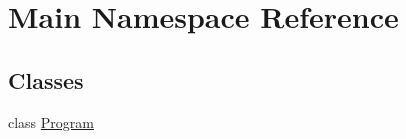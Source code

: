 \hypertarget{namespace_main}{}\section{Main Namespace Reference}
\label{namespace_main}
\subsection*{Classes}
\begin{DoxyCompactItemize}
\item 
class \hyperlink{class_main_1_1_program}{Program}
\end{DoxyCompactItemize}
